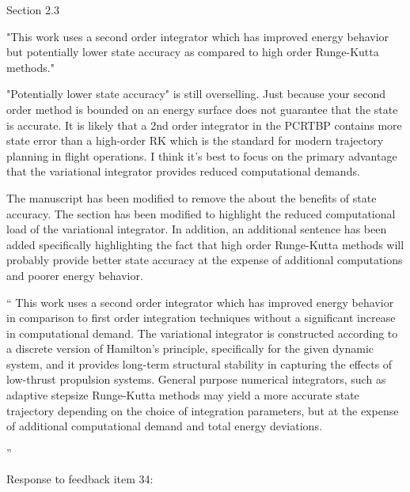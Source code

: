 \documentclass[11pt]{article}
\newenvironment{correction}{\begin{list}{}{\setlength{\leftmargin}{1cm}\setlength{\rightmargin}{1cm}}\vspace{\parsep}\item[]``}{''\end{list}}
\begin{document}
\begin{itemize}
    \item 
        \begin{itshape}
            Section 2.3

            "This work uses a second order integrator which has improved energy behavior but potentially lower state accuracy as compared to high order Runge-Kutta methods."

            "Potentially lower state accuracy" is still overselling.  Just because your second order method is bounded on an energy surface does not guarantee that the state is accurate.  It is likely that a 2nd order integrator in the PCRTBP contains more state error than a high-order RK which is the standard for modern trajectory planning in flight operations.  I think it's best to focus on the primary advantage that the variational integrator provides reduced computational demands.
        \end{itshape}
    
    The manuscript has been modified to remove the about the benefits of state accuracy.
    The section has been modified to highlight the reduced computational load of the variational integrator.
    In addition, an additional sentence has been added specifically highlighting the fact that high order Runge-Kutta methods will probably provide better state accuracy at the expense of additional computations and poorer energy behavior.
    
    \begin{correction}
        This work uses a second order integrator which has improved energy behavior in comparison to first order integration techniques without a significant increase in computational demand.
        The variational integrator is constructed according to a discrete version of Hamilton's principle, specifically for the given dynamic system, and it provides long-term structural stability in capturing the effects of low-thrust propulsion systems.
        General purpose numerical integrators, such as adaptive stepsize Runge-Kutta methods may yield a more accurate state trajectory depending on the choice of integration parameters, but at the expense of additional computational demand and total energy deviations.

    \end{correction}
    \item \begin{itshape}
            Response to feedback item 34:


\end{itshape}
\end{itemize}
\end{document}
